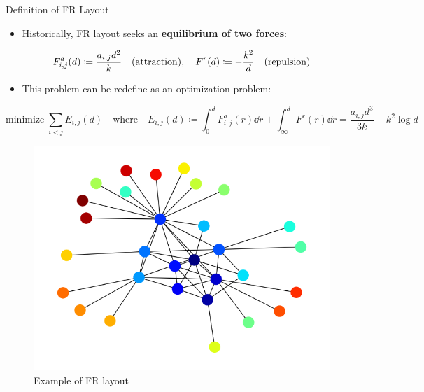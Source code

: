 \documentclass[13pt,aspectratio=169,table,dvipdfmx]{beamer}
\newcommand{\defeq}{\coloneqq}
\newif\ifShowHidden
\begin{document}
\ifShowHidden
  \begin{frame}{Definition of FR Layout}
    \begin{itemize}
      \item Historically, FR layout seeks an \textbf{equilibrium of two forces}:
    \end{itemize}
    \begin{equation*}
      F_{i,j}^a(d) \defeq \frac{a_{i,j} d^2}{k} \text{\quad (attraction)}, \quad F^r(d) \defeq -\frac{k^2}{d} \text{\quad (repulsion)}
    \end{equation*}
    \begin{itemize}
      \item This problem can be redefine as an optimization problem:
    \end{itemize}
    \begin{equation*}
      \mathrm{minimize} \; \sum_{i<j} E_{i,j}(d)
      \quad \mathrm{where} \quad
      E_{i,j}(d) \defeq \int_{0}^{d} F_{i,j}^a(r) \dd{r} + \int_{\infty}^{d} F^r(r) \dd{r} = \frac{a_{i,j} d^3}{3k} - k^2\log{d}
    \end{equation*}
    \begin{figure}[htbp]
      \begin{minipage}{0.49\hsize}
        \centering
        \includegraphics[width=0.6\columnwidth]{imgs/example_fr.png}
        \caption{
          Example of FR layout
        }
      \end{minipage}
      \begin{minipage}{0.49\hsize}
        \centering
\end{minipage}
\end{figure}
\end{frame}
\end{document}
